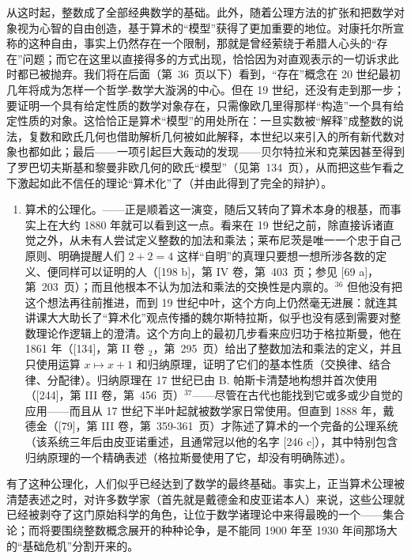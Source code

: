 \begin{enumerate}
\end{enumerate}

从这时起，整数成了全部经典数学的基础。此外，随着公理方法的扩张和把数学对象视为心智的自由创造，基于算术的“模型”获得了更加重要的地位。对康托尔所宣称的这种自由，事实上仍然存在一个限制，那就是曾经萦绕于希腊人心头的“存在”问题；而它在这里以直接得多的方式出现，恰恰因为对直观表示的一切诉求此时都已被抛弃。我们将在后面（第~36~页以下）看到，“存在”概念在 20 世纪最初几年将成为怎样一个哲学-数学大漩涡的中心。但在 19 世纪，还没有走到那一步；要证明一个具有给定性质的数学对象存在，只需像欧几里得那样“构造”一个具有给定性质的对象。这恰恰正是算术“模型”的用处所在：一旦实数被“解释”成整数的说法，复数和欧氏几何也借助解析几何被如此解释，本世纪以来引入的所有新代数对象也都如此；最后——一项引起巨大轰动的发现——贝尔特拉米和克莱因甚至得到了罗巴切夫斯基和黎曼非欧几何的欧氏“模型”（见第~134~页），从而把这些乍看之下激起如此不信任的理论“算术化”了（并由此得到了完全的辩护）。

\begin{enumerate}
\def\labelenumi{\Alph{enumi})}
\setcounter{enumi}{3}
\tightlist
\item
  算术的公理化。——正是顺着这一演变，随后又转向了算术本身的根基，而事实上在大约 1880 年就可以看到这一点。看来在 19 世纪之前，除直接诉诸直觉之外，从未有人尝试定义整数的加法和乘法；莱布尼茨是唯一一个忠于自己原则、明确提醒人们 \(2 + 2 = 4\) 这样“自明”的真理只要想一想所涉各数的定义、便同样可以证明的人（{[}198 b{]}，第 IV 卷，第~403~页；参见 {[}69 a{]}，第~203~页）；而且他根本不认为加法和乘法的交换性是内禀的。\(^{36}\) 但他没有把这个想法再往前推进，而到 19 世纪中叶，这个方向上仍然毫无进展：就连其讲课大大助长了“算术化”观点传播的魏尔斯特拉斯，似乎也没有感到需要对整数理论作逻辑上的澄清。这个方向上的最初几步看来应归功于格拉斯曼，他在 1861 年（{[}134{]}，第 II 卷 \(_{2}\)，第~295~页）给出了整数加法和乘法的定义，并且只使用运算 \(x \mapsto x + 1\) 和归纳原理，证明了它们的基本性质（交换律、结合律、分配律）。归纳原理在 17 世纪已由 B. 帕斯卡清楚地构想并首次使用（{[}244{]}，第 III 卷，第~456~页）\(^{37}\)——尽管在古代也能找到它或多或少自觉的应用——而且从 17 世纪下半叶起就被数学家日常使用。但直到 1888 年，戴德金（{[}79{]}，第 III 卷，第~359-361~页）才陈述了算术的一个完备的公理系统（该系统三年后由皮亚诺重述，且通常冠以他的名字 {[}246 c{]}），其中特别包含归纳原理的一个精确表述（格拉斯曼使用了它，却没有明确陈述）。
\end{enumerate}

有了这种公理化，人们似乎已经达到了数学的最终基础。事实上，正当算术公理被清楚表述之时，对许多数学家（首先就是戴德金和皮亚诺本人）来说，这些公理就已经被剥夺了这门原始科学的角色，让位于数学诸理论中来得最晚的一个——集合论；而将要围绕整数概念展开的种种论争，是不能同 1900 年至 1930 年间那场大的“基础危机”分割开来的。
\relax{}
